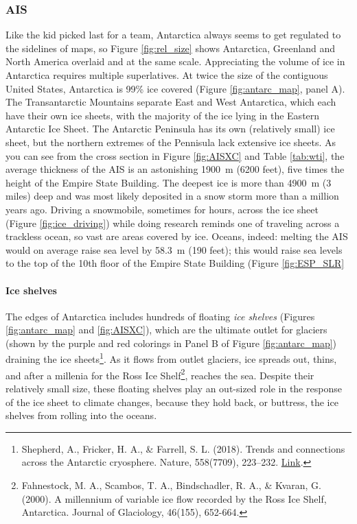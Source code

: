 \documentclass[amstex,12pt]{book}
\begin{document}
\subsubsection{AIS}
Like the kid picked last for a team, Antarctica always seems to get regulated to the sidelines of maps, so Figure \ref{fig:rel_size} shows Antarctica, Greenland and North America overlaid and at the same scale. Appreciating the volume of ice in Antarctica requires multiple superlatives. At twice the size of the contiguous United States, Antarctica is 99\% ice covered (Figure \ref{fig:antarc_map}, panel A). The Transantarctic Mountains separate East and West Antarctica, which each have their own ice sheets, with the majority of the ice lying in the Eastern Antarctic Ice Sheet. The Antarctic Peninsula has its own (relatively small) ice sheet, but the northern extremes of the Pennisula lack extensive ice sheets. As you can see from the cross section in Figure \ref{fig:AISXC} and Table \ref{tab:wti}, the average thickness of the AIS is an astonishing \SI{1900}{\metre} (6200 feet), five times the height of the Empire State Building. The deepest ice is more than \SI{4900}{\metre} (3 miles) deep and was most likely deposited in a snow storm more than a million years ago. Driving a snowmobile, sometimes for hours, across the ice sheet (Figure \ref{fig:ice_driving}) while doing research reminds one of traveling across a trackless ocean, so vast are areas covered by ice. Oceans, indeed: melting the AIS would on average raise sea level by \SI{58.3}{\metre} (190 feet); this would raise sea levels to the top of the 10th floor of the Empire State Building (Figure \ref{fig:ESP_SLR}\\
\paragraph{Ice shelves} The edges of Antarctica includes hundreds of floating \emph{ice shelves} (Figures \ref{fig:antarc_map} and \ref{fig:AISXC}), which are the ultimate outlet for glaciers (shown by the purple and red colorings in Panel B of Figure \ref{fig:antarc_map}) draining the ice sheets\footnote{Shepherd, A., Fricker, H. A., \& Farrell, S. L. (2018). Trends and connections across the Antarctic cryosphere. Nature, 558(7709), 223–232. \href{https://doi.org/10.1038/s41586-018-0171-6}{Link}.}. As it flows from outlet glaciers, ice spreads out, thins, and after a millenia for the Ross Ice Shelf\footnote{Fahnestock, M. A., Scambos, T. A., Bindschadler, R. A., \& Kvaran, G. (2000). A millennium of variable ice flow recorded by the Ross Ice Shelf, Antarctica. Journal of Glaciology, 46(155), 652-664.}, reaches the sea. Despite their relatively small size, these floating shelves play an out-sized role in the response of the ice sheet to climate changes, because they hold back, or buttress, the ice shelves from rolling into the oceans.\\
\end{document}
